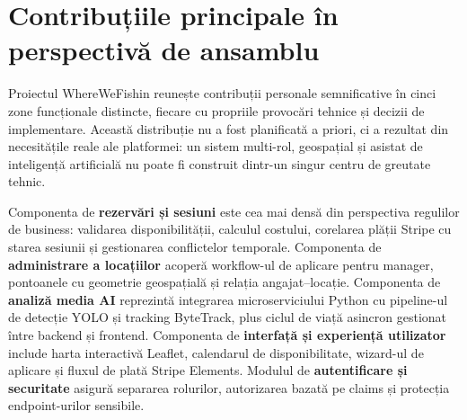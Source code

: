 \section{Contribuțiile principale în perspectivă de ansamblu}

Proiectul WhereWeFishin reunește contribuții personale semnificative în cinci zone funcționale distincte, fiecare cu propriile provocări tehnice și decizii de implementare. Această distribuție nu a fost planificată a priori, ci a rezultat din necesitățile reale ale platformei: un sistem multi-rol, geospațial și asistat de inteligență artificială nu poate fi construit dintr-un singur centru de greutate tehnic.

Componenta de \textbf{rezervări și sesiuni} este cea mai densă din perspectiva regulilor de business: validarea disponibilității, calculul costului, corelarea plății Stripe cu starea sesiunii și gestionarea conflictelor temporale. Componenta de \textbf{administrare a locațiilor} acoperă workflow-ul de aplicare pentru manager, pontoanele cu geometrie geospațială și relația angajat–locație. Componenta de \textbf{analiză media AI} reprezintă integrarea microserviciului Python cu pipeline-ul de detecție YOLO și tracking ByteTrack, plus ciclul de viață asincron gestionat între backend și frontend. Componenta de \textbf{interfață și experiență utilizator} include harta interactivă Leaflet, calendarul de disponibilitate, wizard-ul de aplicare și fluxul de plată Stripe Elements. Modulul de \textbf{autentificare și securitate} asigură separarea rolurilor, autorizarea bazată pe claims și protecția endpoint-urilor sensibile.


